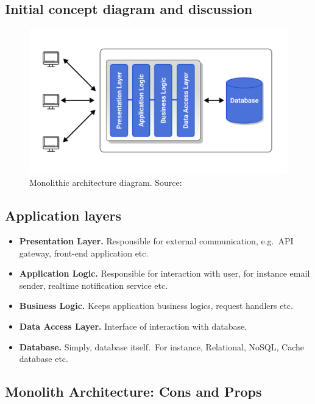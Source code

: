 \subsection{Initial concept diagram and discussion}\label{subsec:initial-concept-diagram}
\begin{figure}[H]
    \centering
    \includegraphics[width=1\textwidth]{Pictures/Monolith_architecture.pdf}
    \caption{Monolithic architecture diagram. Source: }\label{fig:figure2}
\end{figure}

\subsection{Application layers}\label{subsec:application-layers}
\begin{itemize}
    \item \textbf{Presentation Layer.} Responsible for external communication, e.g.\ API gateway, front-end application etc.
    \item \textbf{Application Logic.} Responsible for interaction with user, for instance email sender, realtime notification service etc.
    \item \textbf{Business Logic.} Keeps application business logics, request handlers etc.
    \item \textbf{Data Access Layer.} Interface of interaction with database.
    \item \textbf{Database.} Simply, database itself.\ For instance, Relational, NoSQL, Cache database etc.
\end{itemize}

\subsection{Monolith Architecture: Cons and Props}\label{subsec:monolith-architecture:-cons-and-props}

